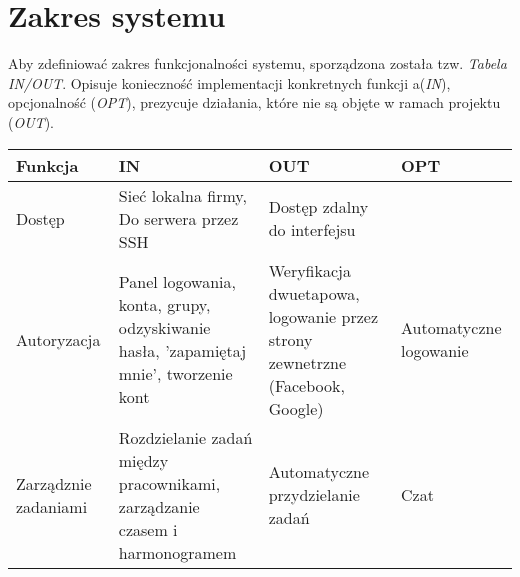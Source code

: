 \documentclass{article}
\begin{document}
\section{Zakres systemu}
Aby zdefiniować zakres funkcjonalności systemu, sporządzona została tzw. \textit{Tabela IN/OUT}.
Opisuje konieczność implementacji konkretnych funkcji a(\textit{IN}), opcjonalność (\textit{OPT}), prezycuje działania,
które nie są objęte w ramach projektu (\textit{OUT}).
\begin{center}
    \begin{tabular}{| p{2cm} | p{3cm} | p{4cm} | p{2cm} |}
    \hline
    Funkcja & IN & OUT & OPT \\
    \hline
    \hline
    Dostęp & Sieć lokalna firmy, Do serwera przez SSH & Dostęp zdalny do interfejsu & \\
    \hline
    Autoryzacja & Panel logowania, konta, grupy, odzyskiwanie hasła, 'zapamiętaj mnie', tworzenie kont & Weryfikacja dwuetapowa, logowanie przez strony zewnetrzne (Facebook, Google) & Automatyczne logowanie\\
    \hline
    Zarządznie zadaniami & Rozdzielanie zadań między pracownikami, zarządzanie czasem i harmonogramem & Automatyczne przydzielanie zadań & Czat \\
    \hline

    \end{tabular}
\end{center}
\end{document}
